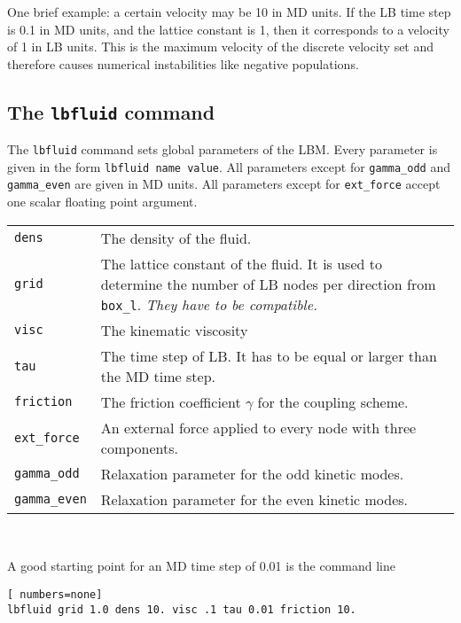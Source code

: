 One brief example: a certain velocity may be 10 in MD units.
If the LB time step is 0.1 in MD units, and the lattice constant
is 1, then it corresponds to a velocity of 1 in LB units. 
This is the maximum velocity of the discrete velocity set and therefore
causes numerical instabilities like negative populations.

\subsection*{The {\tt lbfluid} command}
The {\tt lbfluid} command sets global parameters of the LBM. Every
parameter is given in the form {\tt lbfluid name value}. 
All parameters except for {\tt gamma\_odd} and  {\tt gamma\_even}
are given in MD units. All parameters except for {\tt ext\_force} accept
one scalar floating point argument. \\
\vspace{0,2cm}
\begin{tabular}{p{}p{}}
{\tt dens} & The density of the fluid.\\
{\tt grid} & The lattice constant of the fluid. It is used to determine the number of LB nodes 
per direction from {\tt box\_l}. {\em They have to be compatible.} \\
{\tt visc} & The kinematic viscosity \\
{\tt tau} & The time step of LB. It has to be equal or larger than the MD time step. \\
{\tt friction} & The friction coefficient $\gamma$ for the coupling scheme. \\
{\tt ext\_force} & An external force applied to every node with three components. \\
{\tt gamma\_odd} & Relaxation parameter for the odd kinetic modes. \\
{\tt gamma\_even} & Relaxation parameter for the even kinetic modes.
\end{tabular} \\
\vspace{0,2cm}

A good starting point for an MD time step of 0.01 is the command line
\vspace{0,2cm}
\begin{lstlisting}[ numbers=none]
lbfluid grid 1.0 dens 10. visc .1 tau 0.01 friction 10.
\end{lstlisting}
\vspace{0,2cm}

